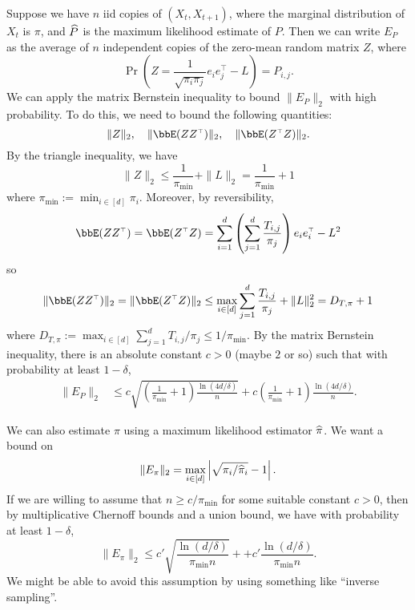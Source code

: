 \documentclass[11pt]{article}
\theoremstyle{plain}
\theoremstyle{definition}
\theoremstyle{remark}
\newcommand\wh{\ensuremath{\widehat}}
\newcommand\norm[1]{\| #1 \|}
\newcommand\Parens[1]{\left( #1 \right)}
\newcommand\Abs[1]{\left| #1 \right|}
\renewcommand\t{{\ensuremath{\scriptscriptstyle{\top}}}}
\begin{document}
Suppose we have $n$ iid copies of $(X_t,X_{t+1})$, where the marginal
distribution of $X_t$ is $\pi$, and $\wh{P}$ is the maximum likelihood
estimate of $P$.
Then we can write $E_P$ as the average of $n$ independent copies of the
zero-mean random matrix $Z$, where
\[
  \Pr\Parens{ Z = \frac1{\sqrt{\pi_i\pi_j}} e_i e_j^\t - L } = P_{i,j} .
\]
We can apply the matrix Bernstein inequality to bound $\norm{E_P}_2$ with
high probability.
To do this, we need to bound the following quantities:
\[
  \norm{Z}_2 , \quad
  \norm{\bbE(ZZ^\t)}_2 , \quad
  \norm{\bbE(Z^\t Z)}_2 .
\]
By the triangle inequality, we have
\[
  \norm{Z}_2
  \leq \frac{1}{\pi_{\min}} + \norm{L}_2
  = \frac{1}{\pi_{\min}} + 1
\]
where $\pi_{\min} := \min_{i\in[d]} \pi_i$.
Moreover, by reversibility,
\[
  \bbE(ZZ^\t)
  = \bbE(Z^\t Z)
  = \sum_{i=1}^d \Parens{ \sum_{j=1}^d \frac{T_{i,j}}{\pi_j} }
  e_ie_i^\t - L^2
\]
so
\[
  \norm{\bbE(ZZ^\t)}_2
  = \norm{\bbE(Z^\t Z)}_2
  \leq \max_{i \in [d]} \sum_{j=1}^d \frac{T_{i,j}}{\pi_j} + \norm{L}_2^2
  = D_{T,\pi} + 1
\]
where $D_{T,\pi} := \max_{i\in[d]} \sum_{j=1}^d T_{i,j} / \pi_j \leq
1/\pi_{\min}$.
By the matrix Bernstein inequality, there is an absolute constant
$c>0$ (maybe $2$ or so) such that with probability at least
$1-\delta$,
\begin{align*}
  \norm{E_P}_2
  & \leq c \sqrt{\Parens{ \frac1{\pi_{\min}} + 1 }\frac{\ln(4d/\delta)}{n}}
  + c \Parens{ \frac1{\pi_{\min}} + 1 } \frac{\ln(4d/\delta)}{n}
  .
\end{align*}

We can also estimate $\pi$ using a maximum likelihood estimator
$\wh\pi$.
We want a bound on
\[
  \norm{E_\pi}_2 = \max_{i\in[d]} \Abs{\sqrt{\pi_i/\wh\pi_i} - 1}
  .
\]
If we are willing to assume that $n \geq c / \pi_{\min}$ for some
suitable constant $c>0$, then by multiplicative Chernoff bounds and a
union bound, we have with probability at least $1-\delta$,
\[
  \norm{E_\pi}_2 \leq
  c' \sqrt{\frac{\ln(d/\delta)}{\pi_{\min} n}} +
  + c' \frac{\ln(d/\delta)}{\pi_{\min} n}
  .
\]
We might be able to avoid this assumption by using something like
``inverse sampling''.



\end{document}
